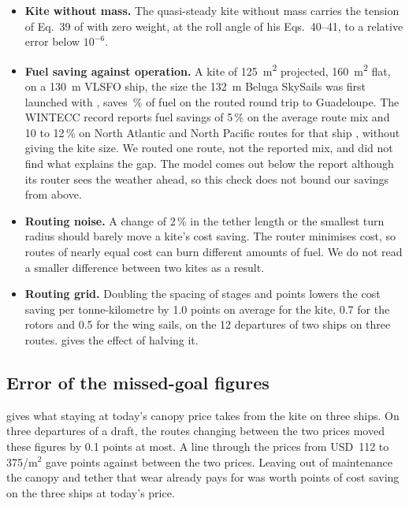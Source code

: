 \begin{itemize}
\item \textbf{Kite without mass.} The quasi-steady kite without mass carries the tension of Eq.~39 of \citet{loyd1980} with zero weight, at the roll angle of his Eqs.~40--41, to a relative error below $10^{-6}$.
\item \textbf{Fuel saving against operation.} A kite of \SI{125}{m^2} projected, \SI{160}{m^2} flat, on a \SI{130}{m} VLSFO ship, the size the \SI{132}{m} Beluga SkySails was first launched with \citep{wiwo2008,noaa2009}, saves \,\% of fuel on the routed round trip to Guadeloupe. The WINTECC record reports fuel savings of 5\,\% on the average route mix and 10 to 12\,\% on North Atlantic and North Pacific routes for that ship \citep{wintecc2009_record}, without giving the kite size.  We routed one route, not the reported mix, and did not find what explains the gap. The model comes out below the report although its router sees the weather ahead, so this check does not bound our savings from above.
\item \textbf{Routing noise.} A change of 2\,\% in the tether length or the smallest turn radius should barely move a kite's cost saving.  The router minimises cost, so routes of nearly equal cost can burn different amounts of fuel. We do not read a smaller difference between two kites as a result.
\item \textbf{Routing grid.} Doubling the spacing of stages and points lowers the cost saving per tonne-kilometre by 1.0 points on average for the kite, 0.7 for the rotors and 0.5 for the wing sails, on the 12 departures of two ships on three routes.  gives the effect of halving it.
\end{itemize}

\subsection{Error of the missed-goal figures}
\label{sec:check_missed}

 gives what staying at today's canopy price takes from the kite on three ships. On three departures of a draft, the routes changing between the two prices moved these figures by 0.1 points at most. A line through the prices from USD~112 to 375/m$^2$ gave  points against  between the two prices. Leaving out of maintenance the canopy and tether that wear already pays for was worth  points of cost saving on the three ships at today's price.


